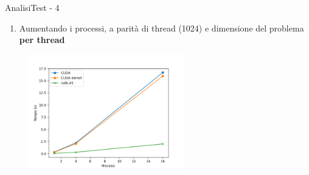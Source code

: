 \begin{frame}{Analisi}{Test - 4}
    \begin{enumerate}
        \item[4.] Aumentando i processi, a parità di thread (1024) e dimensione del problema \textbf{per thread}
    \end{enumerate}

    \begin{figure}[H]
        \centering
        \includegraphics[width=0.6\textwidth]{./imgs/graphs/caso_d.png}
    \end{figure}
\end{frame}

